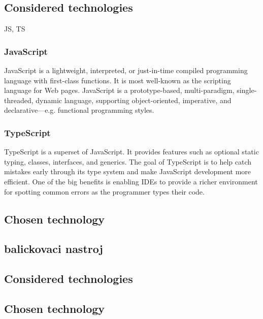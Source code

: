 \subsection*{Considered technologies}
JS, TS

\subsubsection*{JavaScript}
JavaScript is a lightweight, interpreted, or just-in-time compiled programming language with first-class functions. 
It is most well-known as the scripting language for Web pages. 
JavaScript is a prototype-based, multi-paradigm, single-threaded, dynamic language, supporting object-oriented, imperative, and declarative---e.g. functional programming styles.

\subsubsection*{TypeScript}
TypeScript is a superset of JavaScript. 
It provides features such as optional static typing, classes, interfaces, and generics. 
The goal of TypeScript is to help catch mistakes early through its type system and make JavaScript development more efficient. 
One of the big benefits is enabling IDEs to provide a richer environment for spotting common errors as the programmer types their code.

\subsection*{Chosen technology}


\subsection{balickovaci nastroj}
\subsection*{Considered technologies}

\subsubsection*{}

\subsubsection*{}

\subsection*{Chosen technology}

